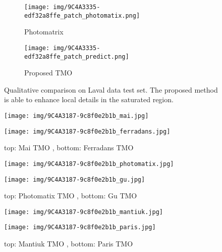 \documentclass[journal]{IEEEtran}
\begin{document}
\begin{figure*}[t]
\begin{subfigure}[b]{0.24\textwidth}
        \end{subfigure}
        \begin{subfigure}[b]{0.24\textwidth}   
            \centering 
            \texttt{[image: img/9C4A3335-edf32a8ffe\_patch\_photomatix.png]}
            \caption[]%
            {{\small Photomatrix \cite{photomatrix} }}    
            \label{fig:mean and std of net34}
        \end{subfigure}
        \begin{subfigure}[b]{0.24\textwidth}   
            \centering 
            \texttt{[image: img/9C4A3335-edf32a8ffe\_patch\_predict.png]}
            \caption[]%
            {{\small Proposed TMO}}    
            \label{fig:mean and std of net44}
        \end{subfigure}
        \caption{Qualitative comparison on Laval data test set. The proposed method is able to enhance local details in the saturated region.}
        \label{fig:Laval_9C4A3335-edf32a8ffe}
\end{figure*} 

\begin{figure*}[t]
{\begin{minipage}{\textwidth}
\centering
            \texttt{[image: img/9C4A3187-9c8f0e2b1b\_mai.jpg]}

            \texttt{[image: img/9C4A3187-9c8f0e2b1b\_ferradans.jpg]}
            
\caption{top: Mai TMO \cite{mai2011optimizing}, bottom: Ferradans TMO \cite{ferradans2011analysis}}
\label{9C4A3187-9c8f0e2b1b-1}
\end{minipage}}
\end{figure*}

\begin{figure*}[t]
{\begin{minipage}{\textwidth}
\centering
            \texttt{[image: img/9C4A3187-9c8f0e2b1b\_photomatix.jpg]}

            \texttt{[image: img/9C4A3187-9c8f0e2b1b\_gu.jpg]}
            
\caption{top: Photomatix TMO \cite{photomatrix}, bottom: Gu TMO \cite{gu2013local}}
\label{9C4A3187-9c8f0e2b1b-2}
\end{minipage}}
\end{figure*}

\begin{figure*}[t]
{\begin{minipage}{\textwidth}
\centering
            \texttt{[image: img/9C4A3187-9c8f0e2b1b\_mantiuk.jpg]}

            \texttt{[image: img/9C4A3187-9c8f0e2b1b\_paris.jpg]}
            
\caption{top: Mantiuk TMO \cite{mantiuk2008display}, bottom: Paris TMO \cite{paris2015local}}
\label{9C4A3187-9c8f0e2b1b-3}
\end{minipage}}
\end{figure*}
\end{document}
